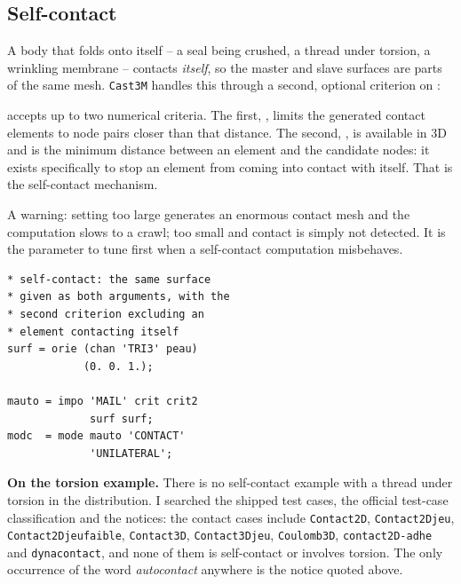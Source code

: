 \subsection*{Self-contact}

A body that folds onto itself -- a seal being crushed, a thread under
torsion, a wrinkling membrane -- contacts \emph{itself}, so the master and
slave surfaces are parts of the same mesh. \texttt{Cast3M} handles this
through a second, optional criterion on :

\begin{castemcom}
%
 accepts up to two numerical criteria. The first,
, limits the generated contact elements to node pairs closer than
that distance. The second, , is available in 3D and is the minimum
distance between an element and the candidate nodes: it exists specifically
to stop an element from coming into contact with itself. That is the
self-contact mechanism.

\medskip
A warning: setting  too large generates an enormous contact mesh and
the computation slows to a crawl; too small and contact is simply not
detected. It is the parameter to tune first when a self-contact computation
misbehaves.
\end{castemcom}
\begin{castemlines}
\begin{verbatim}
* self-contact: the same surface
* given as both arguments, with the
* second criterion excluding an
* element contacting itself
surf = orie (chan 'TRI3' peau)
            (0. 0. 1.);

mauto = impo 'MAIL' crit crit2
             surf surf;
modc  = mode mauto 'CONTACT'
             'UNILATERAL';
\end{verbatim}
\end{castemlines}

\noindent \textbf{On the torsion example.} There is no self-contact example
with a thread under torsion in the distribution. I searched the shipped test
cases, the official test-case classification and the notices: the contact
cases include \texttt{Contact2D}, \texttt{Contact2Djeu},
\texttt{Contact2Djeufaible}, \texttt{Contact3D}, \texttt{Contact3Djeu},
\texttt{Coulomb3D}, \texttt{contact2D-adhe} and \texttt{dynacontact}, and
none of them is self-contact or involves torsion. The only occurrence of the word \emph{autocontact} anywhere
is the  notice quoted above.

